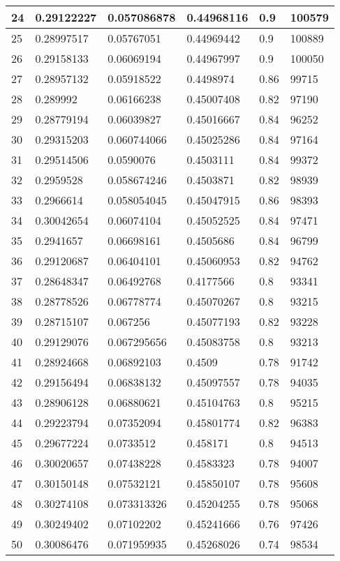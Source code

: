 \begin{longtable}{|l|l|l|l|l|l|}
24 & 0.29122227 & 0.057086878 & 0.44968116 & 0.9 & 100579 \\ \hline 
25 & 0.28997517 & 0.05767051 & 0.44969442 & 0.9 & 100889 \\ \hline 
26 & 0.29158133 & 0.06069194 & 0.44967997 & 0.9 & 100050 \\ \hline 
27 & 0.28957132 & 0.05918522 & 0.4498974 & 0.86 & 99715 \\ \hline 
28 & 0.289992 & 0.06166238 & 0.45007408 & 0.82 & 97190 \\ \hline 
29 & 0.28779194 & 0.06039827 & 0.45016667 & 0.84 & 96252 \\ \hline 
30 & 0.29315203 & 0.060744066 & 0.45025286 & 0.84 & 97164 \\ \hline 
31 & 0.29514506 & 0.0590076 & 0.4503111 & 0.84 & 99372 \\ \hline 
32 & 0.2959528 & 0.058674246 & 0.4503871 & 0.82 & 98939 \\ \hline 
33 & 0.2966614 & 0.058054045 & 0.45047915 & 0.86 & 98393 \\ \hline 
34 & 0.30042654 & 0.06074104 & 0.45052525 & 0.84 & 97471 \\ \hline 
35 & 0.2941657 & 0.06698161 & 0.4505686 & 0.84 & 96799 \\ \hline 
36 & 0.29120687 & 0.06404101 & 0.45060953 & 0.82 & 94762 \\ \hline 
37 & 0.28648347 & 0.06492768 & 0.4177566 & 0.8 & 93341 \\ \hline 
38 & 0.28778526 & 0.06778774 & 0.45070267 & 0.8 & 93215 \\ \hline 
39 & 0.28715107 & 0.067256 & 0.45077193 & 0.82 & 93228 \\ \hline 
40 & 0.29129076 & 0.067295656 & 0.45083758 & 0.8 & 93213 \\ \hline 
41 & 0.28924668 & 0.06892103 & 0.4509 & 0.78 & 91742 \\ \hline 
42 & 0.29156494 & 0.06838132 & 0.45097557 & 0.78 & 94035 \\ \hline 
43 & 0.28906128 & 0.06880621 & 0.45104763 & 0.8 & 95215 \\ \hline 
44 & 0.29223794 & 0.07352094 & 0.45801774 & 0.82 & 96383 \\ \hline 
45 & 0.29677224 & 0.0733512 & 0.458171 & 0.8 & 94513 \\ \hline 
46 & 0.30020657 & 0.07438228 & 0.4583323 & 0.78 & 94007 \\ \hline 
47 & 0.30150148 & 0.07532121 & 0.45850107 & 0.78 & 95608 \\ \hline 
48 & 0.30274108 & 0.073313326 & 0.45204255 & 0.78 & 95068 \\ \hline 
49 & 0.30249402 & 0.07102202 & 0.45241666 & 0.76 & 97426 \\ \hline 
50 & 0.30086476 & 0.071959935 & 0.45268026 & 0.74 & 98534 \\ \hline 
\end{longtable}